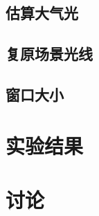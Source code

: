 \documentclass{ctexart}
\begin{document}
\subsection{估算大气光}\label{sec:4.3}

\subsection{复原场景光线}

\subsection{窗口大小}


\section{实验结果}

\section{讨论}




\end{document}
